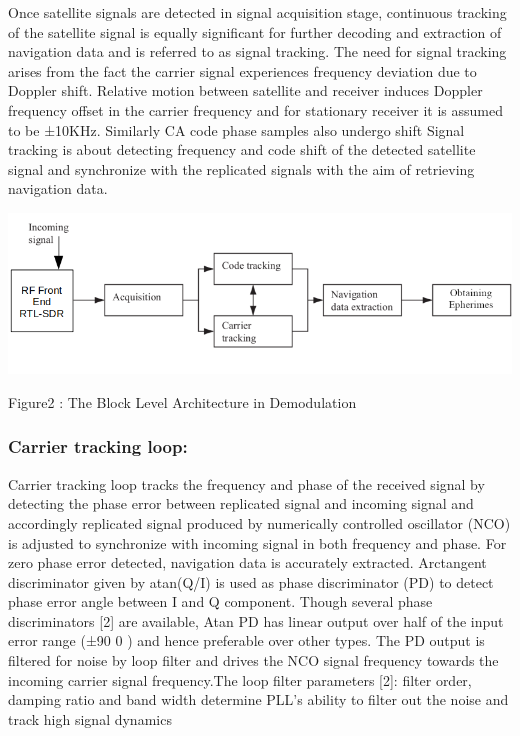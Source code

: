 \documentclass[10pt, onecolumn]{article}
\begin{document}
\begin{enumerate}
Once satellite signals are detected in signal acquisition stage, continuous tracking of the satellite signal is equally significant for further decoding and extraction of navigation data and is referred to as signal tracking. The need for signal tracking arises from the fact the carrier signal experiences frequency deviation due to Doppler shift. Relative motion between satellite and receiver induces Doppler frequency offset in the carrier frequency and for stationary receiver it is assumed to be ±10KHz. Similarly CA code phase samples also undergo shift Signal tracking is about detecting frequency and code shift of the detected satellite signal and synchronize with the replicated signals with the aim of retrieving navigation data.

\includegraphics[width=\linewidth]{./figures/dm2.png}
\begin{center}
Figure2 : The Block Level Architecture in Demodulation
\end{center}


\subsubsection{Carrier tracking loop:}Carrier tracking loop tracks the frequency and phase of the
received signal by detecting the phase error between replicated signal and incoming signal and accordingly replicated signal produced by numerically controlled oscillator (NCO) is adjusted to synchronize with incoming signal in both frequency and phase. For zero phase error detected, navigation data is accurately extracted. Arctangent discriminator given by atan(Q/I) is used as phase
discriminator (PD) to detect phase error angle between I and Q component. Though several phase discriminators [2] are available, Atan PD has linear output over half of the input
error range (±90 0 ) and hence preferable over other types. The PD output is filtered for noise by loop filter and drives the NCO signal frequency towards the incoming carrier signal frequency.The loop filter parameters [2]: filter order, damping ratio and band width determine PLL’s ability to filter out the noise and track high signal dynamics


\end{enumerate}
\end{document}
